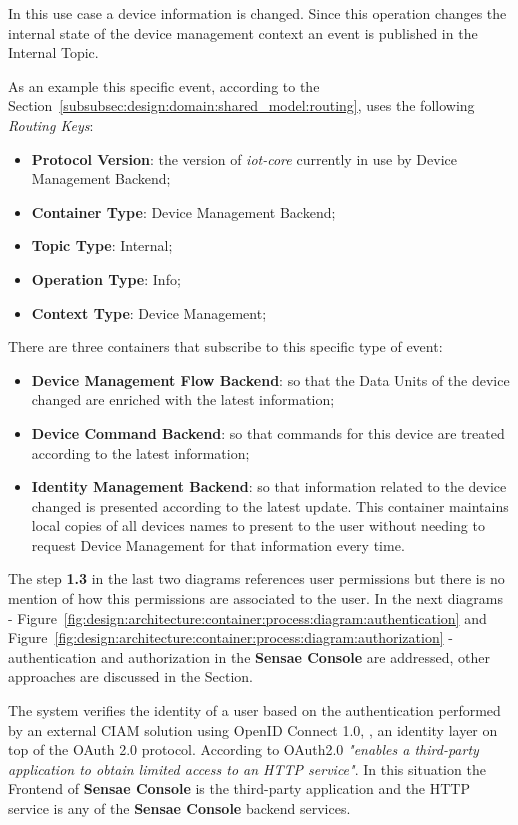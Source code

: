 In this use case a device information is changed. Since this operation changes the internal state of the device management context an event is published in the Internal Topic.

As an example this specific event, according to the Section~\ref{subsubsec:design:domain:shared_model:routing}, uses the following \textit{Routing Keys}:

\begin{itemize}
   \item \textbf{Protocol Version}: the version of \textit{iot-core} currently in use by Device Management Backend;
   \item \textbf{Container Type}: Device Management Backend;
   \item \textbf{Topic Type}: Internal;
   \item \textbf{Operation Type}: Info;
   \item \textbf{Context Type}: Device Management;
\end{itemize}

There are three containers that subscribe to this specific type of event:

\begin{itemize}
   \item \textbf{Device Management Flow Backend}: so that the Data Units of the device changed are enriched with the latest information;
   \item \textbf{Device Command Backend}: so that commands for this device are treated according to the latest information;
   \item \textbf{Identity Management Backend}: so that information related to the device changed is presented according to the latest update. This container maintains local copies of all devices names to present to the user without needing to request Device Management for that information every time.
\end{itemize}

The step \textbf{1.3} in the last two diagrams references user permissions but there is no mention of how this permissions are associated to the user. In the next diagrams - Figure~\ref{fig:design:architecture:container:process:diagram:authentication} and Figure~\ref{fig:design:architecture:container:process:diagram:authorization} - authentication and authorization in the \textbf{Sensae Console} are addressed, other approaches are discussed in the  Section.

The system verifies the identity of a user based on the authentication performed by an external \gls{CIAM} solution using OpenID Connect 1.0, \cite{openid}, an identity layer on top of the OAuth 2.0 protocol. According to \cite{oauth} OAuth2.0 \textit{"enables a third-party application to obtain limited access to an HTTP service"}. In this situation the Frontend of \textbf{Sensae Console} is the third-party application and the HTTP service is any of the \textbf{Sensae Console} backend services.

